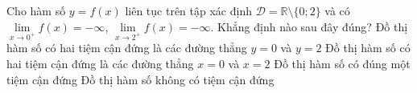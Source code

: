 \begin{ex}%
Cho hàm số $y=f(x)$ liên tục trên tập xác định $\mathscr{D}=\mathbb{R}\setminus\{0; 2\}$ và có $\underset{x\rightarrow 0^+}{\lim}f(x)=-\infty $,
$\underset{x\rightarrow 2^+}{\lim}f(x)=-\infty$. Khẳng định nào sau đây đúng?
\choice
{Đồ thị hàm số có hai tiệm cận đứng là các đường thẳng $y=0$ và $y=2 $}
{\True Đồ thị hàm số có hai tiệm cận đứng là các đường thẳng $x=0$ và $x=2 $}
{Đồ thị hàm số có đúng một tiệm cận đứng}
{Đồ thị hàm số không có tiệm cận đứng}
\end{ex}

